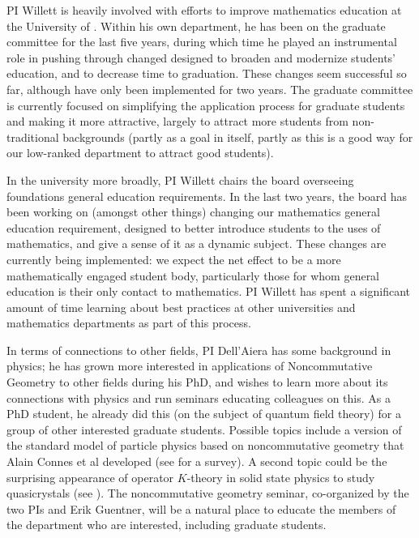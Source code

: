 \documentclass[11pt]{article}
\begin{document}
PI Willett is heavily involved with efforts to improve mathematics education at the University of \Hawaii.  Within his own department, he has been on the graduate committee for the last five years, during which time he played an instrumental role in pushing through changed designed to broaden and modernize students' education, and to decrease time to graduation.  These changes seem successful so far, although have only been implemented for two years.  The graduate committee is currently focused on simplifying the application process for graduate students and making it more attractive, largely to attract more students from non-traditional backgrounds (partly as a goal in itself, partly as this is a good way for our low-ranked department to attract good students).

In the university more broadly, PI Willett chairs the board overseeing foundations general education requirements.  In the last two years, the board has been working on (amongst other things) changing our mathematics general education requirement, designed to better introduce students to the uses of mathematics, and give a sense of it as a dynamic subject.  These changes are currently being implemented: we expect the net effect to be a more mathematically engaged student body, particularly those for whom general education is their only contact to mathematics.  PI Willett has spent a significant amount of time learning about best practices at other universities and mathematics departments as part of this process.  

In terms of connections to other fields, PI Dell'Aiera has some background in physics; %
he has grown more interested in applications of Noncommutative Geometry to other fields during his PhD, and wishes to learn more about its connections with physics and run seminars educating colleagues on this.  As a PhD student, he already did this (on the subject of quantum field theory) for a group of other interested graduate students.  Possible topics include a version of the standard model of particle physics based on noncommutative geometry that  Alain Connes et al developed (see \cite{ChamseddineConnes} for a survey). A second topic could be the surprising appearance of operator $K$-theory in solid state physics to study quasicrystals (see \cite{Bellissard}).  The noncommutative geometry seminar, co-organized by the two PIs and Erik Guentner, will be a natural place to educate the members of the department who are interested, including graduate students.







 

\pagebreak

\end{document}

